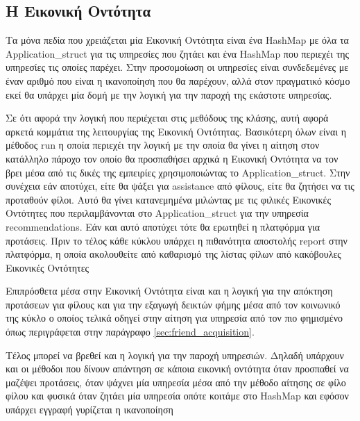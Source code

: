 

\subsection{H Εικονική Οντότητα}

Τα μόνα πεδία που χρειάζεται μία Εικονική Οντότητα είναι ένα HashMap με όλα τα\\
 Application\_struct για τις υπηρεσίες που ζητάει και ένα HashMap που περιεχέι της υπηρεσίες τις οποίες παρέχει.
 Στην προσομοίωση οι υπηρεσίες είναι συνδεδεμένες με έναν αριθμό που είναι η ικανοποίηση που θα παρέχουν, αλλά στον πραγματικό κόσμο εκεί θα υπάρχει μία δομή με την λογική για την παροχή της εκάστοτε υπηρεσίας.

Σε ότι αφορά την λογική που περιέχεται στις μεθόδους της κλάσης, αυτή αφορά αρκετά κομμάτια της λειτουργίας της Εικονική Οντότητας. 
Βασικότερη όλων είναι η μέθοδος run η οποία περιεχέι την λογική με την οποία θα γίνει η αίτηση στον κατάλληλο πάροχο τον οποίο θα προσπαθήσει αρχικά η Εικονική Οντότητα να τον βρει μέσα από τις δικές της εμπειρίες χρησιμοποιώντας το Application\_struct. 
 Στην συνέχεια εάν αποτύχει, είτε θα ψάξει για assistance από φίλους, είτε θα ζητήσει να τις προταθούν φίλοι. 
 Αυτό θα γίνει κατανεμημένα μιλώντας με τις φιλικές Εικονικές Οντότητες που περιλαμβάνονται στο Application\_struct για την υπηρεσία recommendations.
 Εάν και αυτό αποτύχει τότε θα ερωτηθεί η πλατφόρμα για προτάσεις. 
 Πριν το τέλος κάθε κύκλου υπάρχει η πιθανότητα αποστολής report στην πλατφόρμα, η οποία ακολουθείτε από καθαρισμό της λίστας φίλων από κακόβουλες Εικονικές Οντότητες 
 

Επιπρόσθετα μέσα στην Εικονική Οντότητα είναι και η λογική για την απόκτηση προτάσεων για φίλους και για την εξαγωγή δεικτών φήμης μέσα από τον κοινωνικό της κύκλο ο οποίος τελικά οδηγεί στην αίτηση για υπηρεσία από τον πιο φημισμένο όπως περιγράφεται στην παράγραφο  \ref{sec:friend_acquisition}.


Τέλος μπορεί να βρεθεί και η λογική για την παροχή υπηρεσιών. Δηλαδή υπάρχουν και οι μέθοδοι που δίνουν απάντηση σε κάποια εικονική οντότητα όταν προσπαθεί να μαζέψει προτάσεις, όταν ψάχνει μία υπηρεσία μέσα από την μέθοδο αίτησης σε φίλο φίλου και φυσικά όταν ζητάει μία υπηρεσία οπότε κοιτάμε στο HashMap και εφόσον υπάρχει εγγραφή γυρίζεται η ικανοποίηση
\newpage
